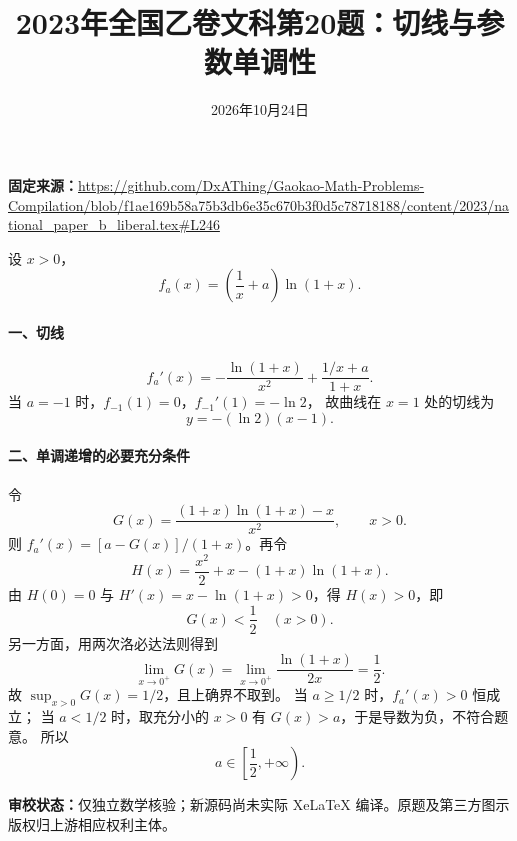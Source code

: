 \documentclass[UTF8,a4paper,11pt]{ctexart}
\title{2023年全国乙卷文科第20题：切线与参数单调性}
\date{2026年10月24日}
\begin{document}
\maketitle
\noindent\textbf{固定来源：}\url{https://github.com/DxAThing/Gaokao-Math-Problems-Compilation/blob/f1ae169b58a75b3db6e35c670b3f0d5c78718188/content/2023/national_paper_b_liberal.tex#L246}

设 $x>0$，
\[
f_a(x)=\left(\frac1x+a\right)\ln(1+x).
\]

\paragraph{一、切线}
\[
f_a'(x)=-\frac{\ln(1+x)}{x^2}
          +\frac{1/x+a}{1+x}.
\]
当 $a=-1$ 时，$f_{-1}(1)=0$，$f_{-1}'(1)=-\ln2$，
故曲线在 $x=1$ 处的切线为
\[
\boxed{y=-(\ln2)(x-1)}.
\]

\paragraph{二、单调递增的必要充分条件}
令
\[
G(x)=\frac{(1+x)\ln(1+x)-x}{x^2},\qquad x>0.
\]
则 $f_a'(x)=[a-G(x)]/(1+x)$。再令
\[
H(x)=\frac{x^2}{2}+x-(1+x)\ln(1+x).
\]
由 $H(0)=0$ 与 $H'(x)=x-\ln(1+x)>0$，得
$H(x)>0$，即
\[
G(x)<\frac12\quad(x>0).
\]
另一方面，用两次洛必达法则得到
\[
\lim_{x\to0^+}G(x)
 =\lim_{x\to0^+}\frac{\ln(1+x)}{2x}
 =\frac12.
\]
故 $\sup_{x>0}G(x)=1/2$，且上确界不取到。
当 $a\ge1/2$ 时，$f_a'(x)>0$ 恒成立；
当 $a<1/2$ 时，取充分小的 $x>0$ 有
$G(x)>a$，于是导数为负，不符合题意。
所以
\[
\boxed{a\in\left[\frac12,+\infty\right)}.
\]

\bigskip
\noindent\textbf{审校状态：}仅独立数学核验；新源码尚未实际
XeLaTeX 编译。原题及第三方图示版权归上游相应权利主体。
\end{document}
